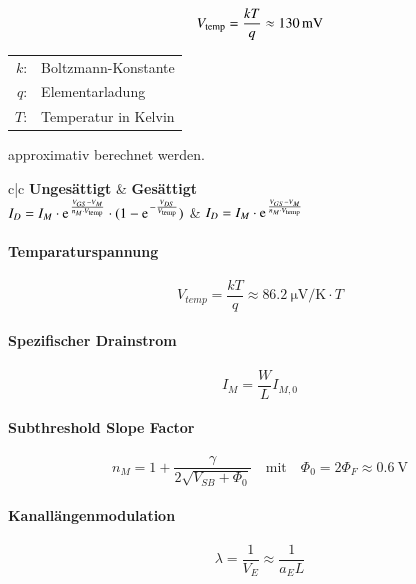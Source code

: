 \begin{minipage}{0.4\columnwidth}
    \[
        V_{\rm temp} = \frac{kT}{q} \approx \qty{130}{\milli\volt}
    \]
\end{minipage}
\hfill
\begin{minipage}{0.5\columnwidth}
    \begin{tabular}{rl}
        $k$: & Boltzmann-Konstante \\
        $q$: & Elementarladung \\
        $T$: & Temperatur in Kelvin \\
    \end{tabular}
\end{minipage}

approximativ berechnet werden.

\renewcommand{\arraystretch}{1.5}
\begin{ctabular}{c|c}
    \textbf{Ungesättigt}                                                                                                & \textbf{Gesättigt}                                                    \\
    $I_D = I_M \cdot \e^{\frac{V_{GS} - V_M}{n_M \cdot V_\text{temp}}} \cdot (1 - \e^{-\frac{V_{DS}}{V_\text{temp}}})$  & $I_D = I_M \cdot \e^{\frac{V_{GS} - V_M}{n_M \cdot V_\text{temp}}}$
\end{ctabular}
\renewcommand{\arraystretch}{1}

\paragraph{Temparaturspannung}
\[
    V_{temp} = \frac{k T}{q} \approx \qty{86.2}{\micro\volt\per\kelvin} \cdot T
\]

\paragraph{Spezifischer Drainstrom}
\[
    I_M = \frac{W}{L} I_{M, 0}
\]

\paragraph{Subthreshold Slope Factor}
\[
    n_M = 1 + \frac{\gamma}{2\sqrt{V_{SB}+\Phi_0}} \quad \text{mit} \quad \Phi_0 = 2 \Phi_F \approx \qty{0.6}{\volt}
\]

\paragraph{Kanallängenmodulation}
\[
    \lambda = \frac{1}{V_E} \approx \frac{1}{a_E L}
\]

